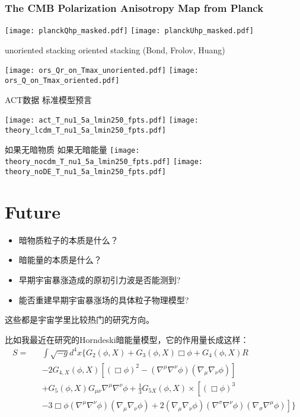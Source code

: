 \documentclass[CJK]{beamer}
\begin{document}
\begin{frame}
  \frametitle{The CMB Polarization Anisotropy Map from Planck}
  \texttt{[image: planckQhp\_masked.pdf]}
  \texttt{[image: planckUhp\_masked.pdf]}  

  {\hskip 0.2in} {\scriptsize unoriented stacking}     {\hskip 0.65in} {\scriptsize oriented stacking (Bond, Frolov, Huang)}
  
  \texttt{[image: ors\_Qr\_on\_Tmax\_unoriented.pdf]}
  \texttt{[image: ors\_Q\_on\_Tmax\_oriented.pdf]}  
  
\end{frame}


\begin{frame}
\bch
\hskip 0.2in ACT数据 \hskip 0.6in   标准模型预言

\texttt{[image: act\_T\_nu1\_5a\_lmin250\_fpts.pdf]}
\texttt{[image: theory\_lcdm\_T\_nu1\_5a\_lmin250\_fpts.pdf]}

如果无暗物质 \hskip 0.5in 如果无暗能量
\texttt{[image: theory\_nocdm\_T\_nu1\_5a\_lmin250\_fpts.pdf]}
\texttt{[image: theory\_noDE\_T\_nu1\_5a\_lmin250\_fpts.pdf]}

\ech
\end{frame}

\section{Future}

\begin{frame}
\bch
\begin{itemize}
\item{暗物质粒子的本质是什么？}
\item{暗能量的本质是什么？}
\item{早期宇宙暴涨造成的原初引力波是否能测到?}
\item{能否重建早期宇宙暴涨场的具体粒子物理模型?}
\end{itemize}

这些都是宇宙学里比较热门的研究方向。
\ech
\end{frame}


\begin{frame}

\bch
比如我最近在研究的Horndeski暗能量模型，它的作用量长成这样：
{\scriptsize
  \begin{eqnarray}
    S = && \int \sqrt{-g}d^4x \Big\{ G_2(\phi, X) + G_3(\phi, X)\Box\phi + G_4(\phi,X)R \nonumber \\
    && - 2G_{4,X}(\phi, X)\left[(\Box\phi)^2 - (\nabla^\mu\nabla^\nu\phi) (\nabla_\mu\nabla_\nu\phi)\right] \nonumber \\
    && + G_5(\phi, X)G_{\mu\nu}\nabla^\mu\nabla^\nu\phi +\frac{1}{3}G_{5X}(\phi, X)\times\left[(\Box\phi)^3 \right.\nonumber \\
    && \left.- 3 \Box\phi(\nabla^\mu\nabla^\nu\phi) (\nabla_\mu\nabla_\nu\phi) + 2(\nabla_\mu\nabla_\nu\phi)(\nabla^\sigma\nabla^\nu\phi) (\nabla_\sigma\nabla^\mu\phi)\right]\Big\}\nonumber
  \end{eqnarray}
}
\ech
\end{frame}
\end{document}
